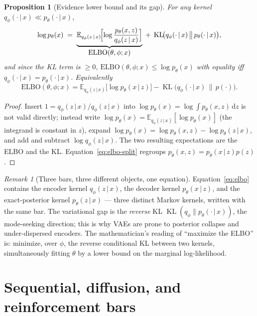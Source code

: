 \documentclass[11pt,oneside]{report}
\theoremstyle{plain}
\newtheorem{proposition}[theorem]{Proposition}
\theoremstyle{definition}
\theoremstyle{remark}
\newtheorem{remark}[theorem]{Remark}
\newcommand{\E}{\mathbb{E}}
\newcommand{\dd}{\,\mathrm{d}}
\newcommand{\given}{\,\vert\,}
\DeclareMathOperator{\KL}{KL}
\numberwithin{equation}{chapter}
\begin{document}
\begin{proposition}[Evidence lower bound and its gap]\label{prop:elbo}
For any kernel $q_\phi(\cdot\given x)\ll p_\theta(\cdot\given x)$,
\begin{equation}\label{eq:elbo}
  \log p_\theta(x)
  \;=\;\underbrace{\E_{q_\phi(z\given x)}\!\Bigl[\log\frac{p_\theta(x,z)}
        {q_\phi(z\given x)}\Bigr]}_{\displaystyle \mathrm{ELBO}(\theta,\phi;x)}
   \;+\;\KL\!\bigl(q_\phi(\cdot\given x)\,\big\|\,p_\theta(\cdot\given x)\bigr),
\end{equation}
and since the KL term is $\ge 0$, $\mathrm{ELBO}(\theta,\phi;x)\le\log
p_\theta(x)$ with equality iff $q_\phi(\cdot\given x)=p_\theta(\cdot\given
x)$. Equivalently
\begin{equation}\label{eq:elbo-split}
  \mathrm{ELBO}(\theta,\phi;x)
  =\E_{q_\phi(z\given x)}\!\bigl[\log p_\theta(x\given z)\bigr]
   -\KL\!\bigl(q_\phi(\cdot\given x)\,\big\|\,p(\cdot)\bigr).
\end{equation}
\end{proposition}
\begin{proof}
Insert $1=q_\phi(z\given x)/q_\phi(z\given x)$ into $\log
p_\theta(x)=\log\int p_\theta(x,z)\dd z$ is not valid directly; instead
write $\log p_\theta(x)=\E_{q_\phi(z\given x)}[\log p_\theta(x)]$ (the
integrand is constant in $z$), expand $\log p_\theta(x)=\log
p_\theta(x,z)-\log p_\theta(z\given x)$, and add and subtract $\log
q_\phi(z\given x)$. The two resulting expectations are the ELBO and the KL.
Equation~\eqref{eq:elbo-split} regroups $p_\theta(x,z)=p_\theta(x\given
z)p(z)$.
\end{proof}

\begin{remark}[Three bars, three different objects, one equation]
Equation~\eqref{eq:elbo} contains the encoder kernel $q_\phi(z\given x)$, the
decoder kernel $p_\theta(x\given z)$, and the exact-posterior kernel
$p_\theta(z\given x)$ --- three distinct Markov kernels, written with the
same bar. The variational gap is the \emph{reverse} KL
$\KL(q_\phi\|p_\theta(\cdot\given x))$, the mode-seeking direction; this is
why VAEs are prone to posterior collapse and under-dispersed encoders. The
mathematician's reading of ``maximize the ELBO'' is: minimize, over $\phi$,
the reverse conditional KL between two kernels, simultaneously fitting
$\theta$ by a lower bound on the marginal log-likelihood.
\end{remark}

\chapter{Sequential, diffusion, and reinforcement bars}
\end{document}
